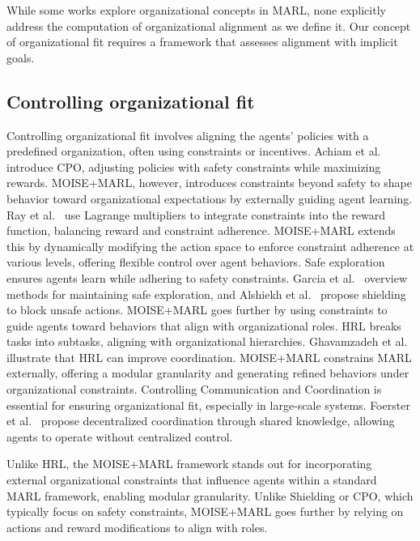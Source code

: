 \documentclass[sigconf]{aamas}
\begin{document}
While some works explore organizational concepts in MARL, none explicitly address the computation of organizational alignment as we define it. Our concept of organizational fit requires a framework that assesses alignment with implicit goals.


\subsection{Controlling organizational fit}
Controlling organizational fit involves aligning the agents' policies with a predefined organization, often using constraints or incentives.
%
Achiam et al.~\cite{achiam2017cpo} introduce CPO, adjusting policies with safety constraints while maximizing rewards. MOISE+MARL, however, introduces constraints beyond safety to shape behavior toward organizational expectations by externally guiding agent learning.
%
Ray et al.~\cite{ray2019benchmarking} use Lagrange multipliers to integrate constraints into the reward function, balancing reward and constraint adherence. MOISE+MARL extends this by dynamically modifying the action space to enforce constraint adherence at various levels, offering flexible control over agent behaviors.
%
Safe exploration ensures agents learn while adhering to safety constraints. Garcia et al.~\cite{garcia2015comprehensive} overview methods for maintaining safe exploration, and Alshiekh et al.~\cite{alshiekh2018safe} propose shielding to block unsafe actions. MOISE+MARL goes further by using constraints to guide agents toward behaviors that align with organizational roles.
%
HRL breaks tasks into subtasks, aligning with organizational hierarchies. Ghavamzadeh et al.~\cite{ghavamzadeh2006hrl} illustrate that HRL can improve coordination. MOISE+MARL constrains MARL externally, offering a modular granularity and generating refined behaviors under organizational constraints.
%
Controlling Communication and Coordination is essential for ensuring organizational fit, especially in large-scale systems. Foerster et al.~\cite{foerster2018communication} propose decentralized coordination through shared knowledge, allowing agents to operate without centralized control.

Unlike HRL, the MOISE+MARL framework stands out for incorporating external organizational constraints that influence agents within a standard MARL framework, enabling modular granularity. Unlike Shielding or CPO, which typically focus on safety constraints, MOISE+MARL goes further by relying on actions and reward modifications to align with roles. %
\end{document}
